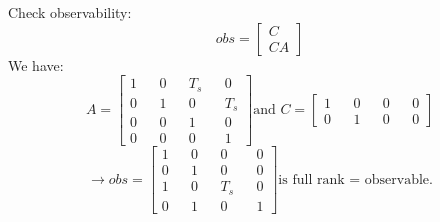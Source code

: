 \documentclass[12pt,a4paper]{article}
\begin{document}
	Check observability:
	\[obs = 
	\begin{bmatrix}
		C  \\
		CA 
	\end{bmatrix}\]
	We have:
	\[A = 
	\begin{bmatrix}
		1 &   & 0 &   & T_s &   & 0   \\
		0 &   & 1 &   & 0   &   & T_s \\
		0 &   & 0 &   & 1   &   & 0   \\
		0 &   & 0 &   & 0   &   & 1   
	\end{bmatrix} \text{and } C = 
	\begin{bmatrix}
		1 &   & 0 &   & 0 &   & 0 \\
		0 &   & 1 &   & 0 &   & 0 
	\end{bmatrix}\]
	\[\rightarrow obs = 
	\begin{bmatrix}
		1 &   & 0 &   & 0   &   & 0 \\
		0 &   & 1 &   & 0   &   & 0 \\
		1 &   & 0 &   & T_s &   & 0 \\
		0 &   & 1 &   & 0   &   & 1 
	\end{bmatrix} \text{is full rank = observable.}\]
	
	
\end{document}

